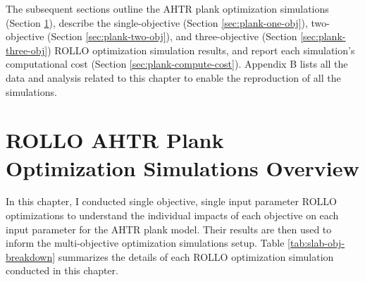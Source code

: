 The subsequent sections outline the \gls{AHTR} plank optimization simulations 
(Section \ref{sec:plank-overview}), describe the single-objective (Section 
\ref{sec:plank-one-obj}), two-objective (Section \ref{sec:plank-two-obj}), and 
three-objective (Section \ref{sec:plank-three-obj}) \gls{ROLLO} optimization 
simulation results, and report each simulation's computational cost 
(Section \ref{sec:plank-compute-cost}).
Appendix B lists all the data and analysis related to this chapter to enable the 
reproduction of all the simulations.

\section{ROLLO AHTR Plank Optimization Simulations Overview}
\label{sec:plank-overview}
In this chapter, I conducted single objective, single input parameter 
\gls{ROLLO} optimizations to understand the individual impacts of each objective on 
each input parameter for the \gls{AHTR} plank model. 
Their results are then used to inform the multi-objective optimization simulations setup. 
Table \ref{tab:slab-obj-breakdown} summarizes the details of each \gls{ROLLO} 
optimization simulation conducted in this chapter.
